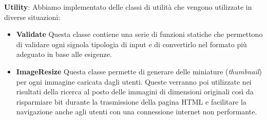   \par \textbf{Utility}: Abbiamo implementato delle classi di utilit\`a che vengono utilizzate in diverse situazioni:
    \begin{itemize}
      \item \textbf{Validate} Questa classe contiene una serie di funzioni statiche che permettono di validare ogni signola tipologia di input e di convertirlo nel formato pi\`u adeguato in base alle esigenze.
      \item \textbf{ImageResize} Questa classe permette di generare delle miniature (\textit{thumbnail}) per ogni immagine caricata dagli utenti. Queste verranno poi utilizzate nei risultati della ricerca al posto delle immagini di dimensioni originali cos\`i da risparmiare bit durante la trasmissione della pagina HTML e facilitare la navigazione anche agli utenti con una connessione internet non performante.
    \end{itemize}


  
